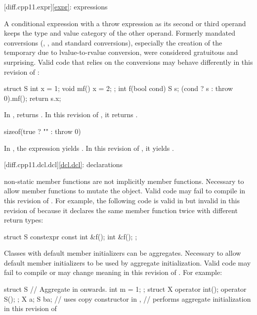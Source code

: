 [diff.cpp11.expr]{\ref{expr}: expressions}

\change
A conditional expression with a throw expression as its second or third
operand keeps the type and value category of the other operand.
\rationale
Formerly mandated conversions (,
, and 
standard conversions), especially the creation of the temporary due to
lvalue-to-rvalue conversion, were considered gratuitous and surprising.
\effect
Valid \CppXI{} code that relies on the conversions may behave differently
in this revision of \Cpp{}:
\begin{codeblock}
struct S {
  int x = 1;
  void mf() { x = 2; }
};
int f(bool cond) {
  S s;
  (cond ? s : throw 0).mf();
  return s.x;
}
\end{codeblock}

In \CppXI{},  returns . In this revision of \Cpp{},
it returns .

\begin{codeblock}
sizeof(true ? "" : throw 0)
\end{codeblock}

In \CppXI{}, the expression yields . In this
revision of \Cpp{}, it yields .

[diff.cpp11.dcl.dcl]{\ref{dcl.dcl}: declarations}

\change
{} non-static member functions are not implicitly
 member functions.
\rationale
Necessary to allow  member functions to mutate
the object.
\effect
Valid \CppXI{} code may fail to compile in this revision of \Cpp{}.
For example, the following code is valid in \CppXI{}
but invalid in this revision of \Cpp{} because it declares the same member
function twice with different return types:
\begin{codeblock}
struct S {
  constexpr const int &f();
  int &f();
};
\end{codeblock}

\change
Classes with default member initializers can be aggregates.
\rationale
Necessary to allow default member initializers to be used
by aggregate initialization.
\effect
Valid \CppXI{} code may fail to compile or may change meaning in this revision of \Cpp{}.
For example:
\begin{codeblock}
struct S {          // Aggregate in \CppXIV{} onwards.
  int m = 1;
};
struct X {
  operator int();
  operator S();
};
X a{};
S b{a};             // uses copy constructor in \CppXI{},
                    // performs aggregate initialization in this revision of \Cpp{}
\end{codeblock}

